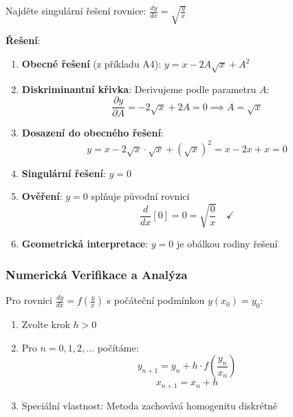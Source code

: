 \begin{example}
Najděte singulární řešení rovnice: $\frac{dy}{dx} = \sqrt{\frac{y}{x}}$
\vspace{0.3\baselineskip}

\textbf{Řešení}: 
\begin{enumerate}
\item \textbf{Obecné řešení} (z příkladu A4): $y = x - 2A\sqrt{x} + A^2$

\item \textbf{Diskriminantní křivka}: Derivujeme podle parametru $A$:
\[
\frac{\partial y}{\partial A} = -2\sqrt{x} + 2A = 0 \implies A = \sqrt{x}
\]

\item \textbf{Dosazení do obecného řešení}:
\[
y = x - 2\sqrt{x}\cdot\sqrt{x} + (\sqrt{x})^2 = x - 2x + x = 0
\]

\item \textbf{Singulární řešení}: $y = 0$

\item \textbf{Ověření}: $y = 0$ splňuje původní rovnici
\[
\frac{d}{dx}[0] = 0 = \sqrt{\frac{0}{x}} \quad \checkmark
\]

\item \textbf{Geometrická interpretace}: $y = 0$ je obálkou rodiny řešení
\end{enumerate}
\end{example}

\vspace{0.8\baselineskip}

\subsubsection{Numerická Verifikace a Analýza}
\label{subsubsec:numericka-verifikace}

\begin{method}
\label{met:euler-homogenni}
Pro rovnici $\frac{dy}{dx} = f\left(\frac{y}{x}\right)$ s počáteční podmínkou $y(x_0) = y_0$:

\begin{enumerate}
\item Zvolte krok $h > 0$
\item Pro $n = 0, 1, 2, \dots$ počítáme:
\[
y_{n+1} = y_n + h\cdot f\left(\frac{y_n}{x_n}\right)
\]
\[
x_{n+1} = x_n + h
\]
\item Speciální vlastnost: Metoda zachovává homogenitu diskrétně
\end{enumerate}
\end{method}

